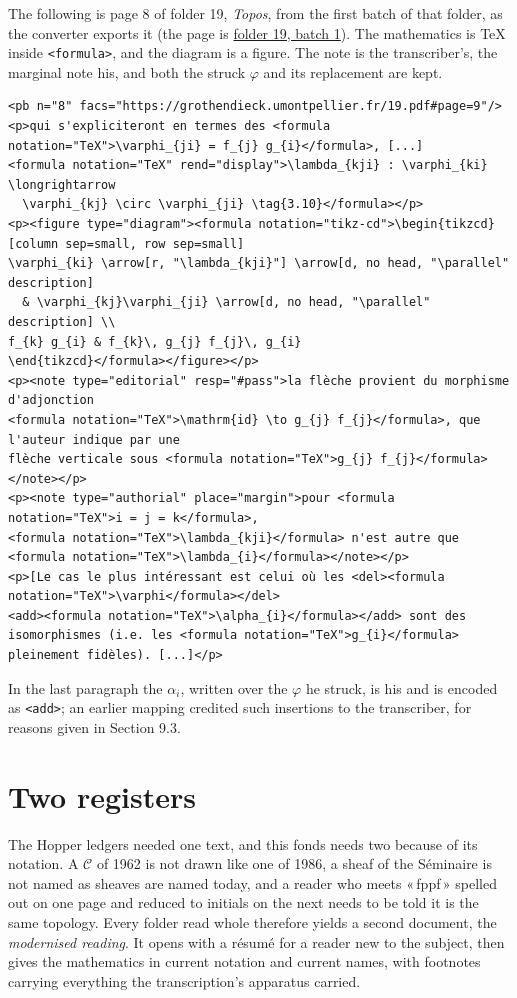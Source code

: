 \documentclass[11pt]{article}
\newcommand{\q}[1]{«\,#1\,»}
\newcommand{\lf}[3]{\href{https://grothendieck.commutator.io/\##1/#2}{#3}}
\begin{document}
The following is page 8 of folder 19, \emph{Topos}, from the first batch of that folder, as the converter exports it (the page is \lf{19}{1/p8}{folder 19, batch 1}). The mathematics is TeX inside \texttt{<formula>}, and the diagram is a figure. The note is the transcriber's, the marginal note his, and both the struck \(\varphi\) and its replacement are kept.

\begin{lstlisting}
<pb n="8" facs="https://grothendieck.umontpellier.fr/19.pdf#page=9"/>
<p>qui s'expliciteront en termes des <formula notation="TeX">\varphi_{ji} = f_{j} g_{i}</formula>, [...]
<formula notation="TeX" rend="display">\lambda_{kji} : \varphi_{ki} \longrightarrow
  \varphi_{kj} \circ \varphi_{ji} \tag{3.10}</formula></p>
<p><figure type="diagram"><formula notation="tikz-cd">\begin{tikzcd}[column sep=small, row sep=small]
\varphi_{ki} \arrow[r, "\lambda_{kji}"] \arrow[d, no head, "\parallel" description]
  & \varphi_{kj}\varphi_{ji} \arrow[d, no head, "\parallel" description] \\
f_{k} g_{i} & f_{k}\, g_{j} f_{j}\, g_{i}
\end{tikzcd}</formula></figure></p>
<p><note type="editorial" resp="#pass">la flèche provient du morphisme d'adjonction
<formula notation="TeX">\mathrm{id} \to g_{j} f_{j}</formula>, que l'auteur indique par une
flèche verticale sous <formula notation="TeX">g_{j} f_{j}</formula></note></p>
<p><note type="authorial" place="margin">pour <formula notation="TeX">i = j = k</formula>,
<formula notation="TeX">\lambda_{kji}</formula> n'est autre que
<formula notation="TeX">\lambda_{i}</formula></note></p>
<p>[Le cas le plus intéressant est celui où les <del><formula notation="TeX">\varphi</formula></del>
<add><formula notation="TeX">\alpha_{i}</formula></add> sont des
isomorphismes (i.e. les <formula notation="TeX">g_{i}</formula> pleinement fidèles). [...]</p>
\end{lstlisting}

In the last paragraph the \(\alpha_i\), written over the \(\varphi\) he struck, is his and is encoded as \texttt{<add>}; an earlier mapping credited such insertions to the transcriber, for reasons given in Section 9.3.

\section{Two registers}

The Hopper ledgers needed one text, and this fonds needs two because of its notation. A \(\mathcal{C}\) of 1962 is not drawn like one of 1986, a sheaf of the Séminaire is not named as sheaves are named today, and a reader who meets \q{fppf} spelled out on one page and reduced to initials on the next needs to be told it is the same topology. Every folder read whole therefore yields a second document, the \emph{modernised reading}. It opens with a résumé for a reader new to the subject, then gives the mathematics in current notation and current names, with footnotes carrying everything the transcription's apparatus carried.
\end{document}

